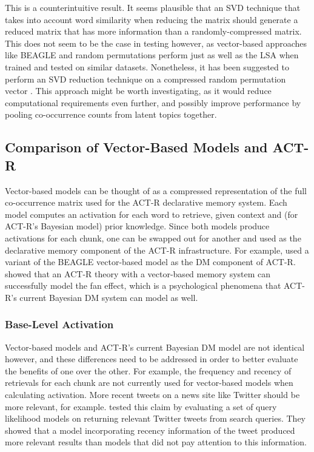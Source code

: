 \documentclass[man,floatsintext,donotrepeattitle]{apa6}
\begin{document}
This is a counterintuitive result.
It seems plausible that an SVD technique that takes into account word similarity when reducing the matrix should generate a reduced matrix that has more information than a randomly-compressed matrix.
This does not seem to be the case in testing however, as vector-based approaches like BEAGLE and random permutations perform just as well as the LSA when trained and tested on similar datasets.
Nonetheless, it has been suggested to perform an SVD reduction technique on a compressed random permutation vector \parencite{Kanerva2000}.
This approach might be worth investigating, as it would reduce computational requirements even further, and possibly improve performance by pooling co-occurrence counts from latent topics together.

\subsection{Comparison of Vector-Based Models and ACT-R}

Vector-based models can be thought of as a compressed representation of the full co-occurrence matrix used for the ACT-R declarative memory system.
Each model computes an activation for each word to retrieve, given context and (for ACT-R's Bayesian model) prior knowledge.
Since both models produce activations for each chunk, one can be swapped out for another and used as the declarative memory component of the ACT-R infrastructure.
For example, \textcite{Rutledge2007} used a variant of the BEAGLE vector-based model as the DM component of ACT-R.
\textcite{Rutledge2008} showed that an ACT-R theory with a vector-based memory system can successfully model the fan effect, which is a psychological phenomena that ACT-R's current Bayesian DM system can model as well.

\subsubsection{Base-Level Activation}

Vector-based models and ACT-R's current Bayesian DM model are not identical however, and these differences need to be addressed in order to better evaluate the benefits of one over the other.
For example, the frequency and recency of retrievals for each chunk are not currently used for vector-based models when calculating activation.
More recent tweets on a news site like Twitter should be more relevant, for example.
\textcite{Efron2011} tested this claim by evaluating a set of query likelihood models on returning relevant Twitter tweets from search queries.
They showed that a model incorporating recency information of the tweet produced more relevant results than models that did not pay attention to this information.
\end{document}
